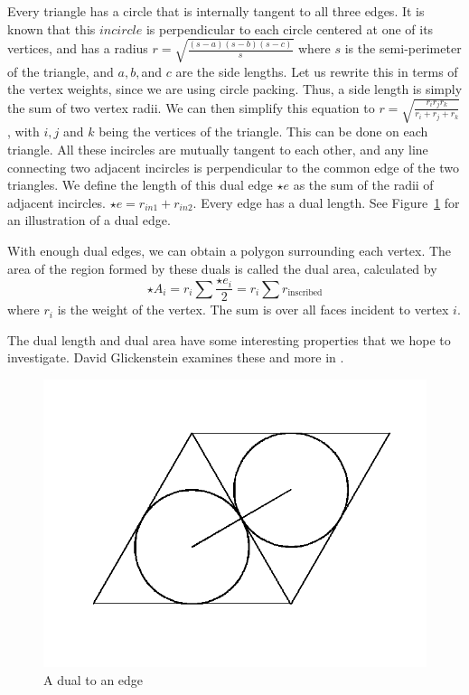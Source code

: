 \documentclass[12pt]{article}
\begin{document}
Every triangle has a circle that is internally tangent to all three edges. It is known that this $incircle$ is perpendicular to each circle centered at one of its vertices, and has a radius $\displaystyle r = \sqrt{\frac{(s-a)(s-b)(s-c)}{s}}$ where $s$ is the semi-perimeter of the triangle, and $a, b, $and $c$ are the side lengths. Let us rewrite this in terms of the vertex weights, since we are using circle packing. Thus, a side length is simply the sum of two vertex radii. We can then simplify this equation to $\displaystyle r = \sqrt{\frac{r_i r_j r_k}{r_i + r_j + r_k}}$, with $i, j$ and $k$ being the vertices of the triangle. This can be done on each triangle. All these incircles are mutually tangent to each other, and any line connecting two adjacent incircles is perpendicular to the common edge of the two triangles. We define the length of this dual edge $\star e$ as the sum of the radii of adjacent incircles. $\star e = r_{in1} + r_{in2}$. Every edge has a dual length. See Figure~\ref{fig:dual} for an illustration of a dual edge.\newline

\noindent With enough dual edges, we can obtain a polygon surrounding each vertex. The area of the region formed by these duals is called the dual area, calculated by $$\star A_i = r_i\sum{\frac{\star e_i}{2}} = r_i\sum{r_{\mbox{inscribed}}}$$ where $r_i$ is the weight of the vertex. The sum is over all faces incident to vertex $i$.\newline

\noindent The dual length and dual area have some interesting properties that we hope to investigate. David Glickenstein examines these and more in \cite{Dave}. 

\begin{figure}
\centering
\includegraphics[scale = 0.4]{dual.png}
\caption{A dual to an edge}
\label{fig:dual}
\end{figure} 
\end{document}
